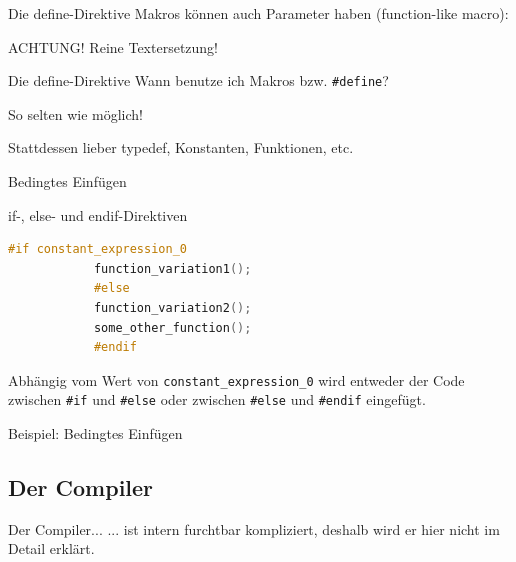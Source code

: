 \begin{frame}[fragile]{Die define-Direktive}
	Makros können auch Parameter haben (function-like macro):
	\vspace{1em}
	
	\footnotesize
	
	
	\alert{ACHTUNG! Reine Textersetzung!}
\end{frame}

\begin{frame}[fragile]{Die define-Direktive}
	Wann benutze ich Makros bzw. \verb|#define|?
	
	\vspace{2em}
	\uncover<+->
	{
		\alert{So selten wie möglich!}
		
		Stattdessen lieber typedef, Konstanten, Funktionen, etc.
	}
\end{frame}

\begin{frame}[fragile]{Bedingtes Einfügen}
	\begin{block}{if-, else- und endif-Direktiven}
		\begin{lstlisting}[language=C++]
			#if constant_expression_0
			function_variation1();
			#else
			function_variation2();
			some_other_function();
			#endif
		\end{lstlisting}
		Abhängig vom Wert von \verb|constant_expression_0| wird entweder der Code zwischen \verb|#if| und \verb|#else| oder zwischen \verb|#else| und \verb|#endif| eingefügt.
	\end{block}
\end{frame}

\begin{frame}[t]{Beispiel: Bedingtes Einfügen}
	\footnotesize
	\only<1>{
		
	}
	\only<2>{
		
	}
	\only<3>{
		
	}
\end{frame}


\subsection{Der Compiler}
\begin{frame}[fragile]{Der Compiler...}
	... ist intern furchtbar kompliziert, deshalb wird er hier nicht im Detail erklärt.
\end{frame}


